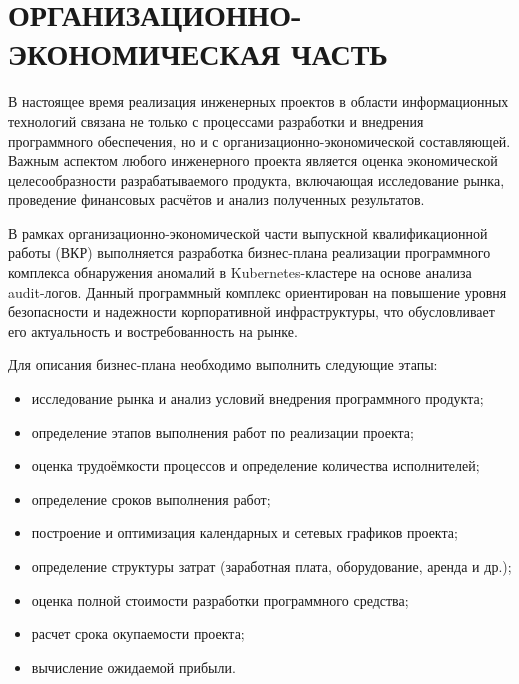 \section{ОРГАНИЗАЦИОННО-ЭКОНОМИЧЕСКАЯ ЧАСТЬ}

В настоящее время реализация инженерных проектов в области информационных технологий связана не только с процессами разработки и внедрения программного обеспечения, но и с организационно-экономической составляющей. Важным аспектом любого инженерного проекта является оценка экономической целесообразности разрабатываемого продукта, включающая исследование рынка, проведение финансовых расчётов и анализ полученных результатов.

В рамках организационно-экономической части выпускной квалификационной работы (ВКР) выполняется разработка бизнес-плана реализации программного комплекса обнаружения аномалий в Kubernetes-кластере на основе анализа audit-логов. Данный программный комплекс ориентирован на повышение уровня безопасности и надежности корпоративной инфраструктуры, что обусловливает его актуальность и востребованность на рынке.

Для описания бизнес-плана необходимо выполнить следующие этапы:

\begin{itemize}
    \item исследование рынка и анализ условий внедрения программного продукта;
    \item определение этапов выполнения работ по реализации проекта;
    \item оценка трудоёмкости процессов и определение количества исполнителей;
    \item определение сроков выполнения работ;
    \item построение и оптимизация календарных и сетевых графиков проекта;
    \item определение структуры затрат (заработная плата, оборудование, аренда и др.);
    \item оценка полной стоимости разработки программного средства;
    \item расчет срока окупаемости проекта;
    \item вычисление ожидаемой прибыли.
\end{itemize}








